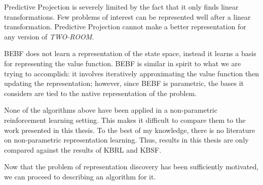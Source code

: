 Predictive Projection is severely limited by the fact that it only finds linear
transformations. Few problems of interest can be represented well after a
linear transformation. Predictive Projection cannot make a better
representation for any version of \textit{TWO-ROOM}.

BEBF does not learn a representation of the state space, instead it
learns a basis for representing the value function.
BEBF is similar in spirit to what we are trying to accomplish:
it involves iteratively approximating the value function then updating the
representation; however, since BEBF is parametric, the bases
it considers are tied to the native representation of the problem.

None of the algorithms above have been applied in a non-parametric
reinforcement learning setting. 
This makes it difficult to compare them to the work presented in this thesis.
To the best of my knowledge, there is no literature on non-parametric
representation learning.
Thus, results in this thesis are only compared against the results of
KBRL and KBSF.

Now that the problem of representation discovery has been sufficiently
motivated, we can proceed to describing an algorithm for it.

